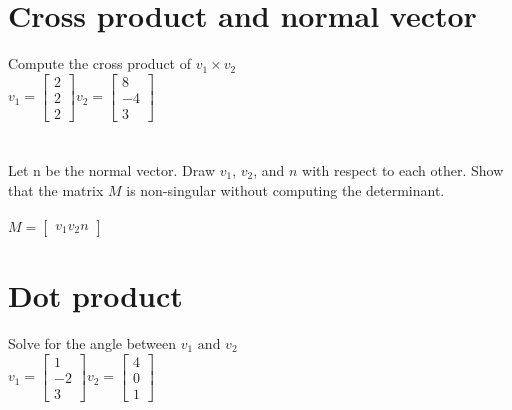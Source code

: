 \documentclass{article}
\begin{document}
\section{Cross product and normal vector}
Compute the cross product of $v_1 \times v_2$\\
$v_1=\begin{bmatrix}
2  \\
2   \\
2
\end{bmatrix}
v_2=\begin{bmatrix}
8  \\
-4   \\
3
\end{bmatrix}$ \\\\\\
Let n be the normal vector. Draw $v_1$, $v_2$, and $n$ with respect to each other. Show that the matrix $M$ is non-singular without computing the determinant.\\\\
$M=\begin{bmatrix}
v_1 v_2 n
\end{bmatrix}$

\section{Dot product}
Solve for the angle between $v_1 \text{ and } v_2$\\
$v_1=\begin{bmatrix}
1  \\
-2   \\
3
\end{bmatrix}
v_2=\begin{bmatrix}
4  \\
0   \\
1
\end{bmatrix}$
\newpage
\end{document}
